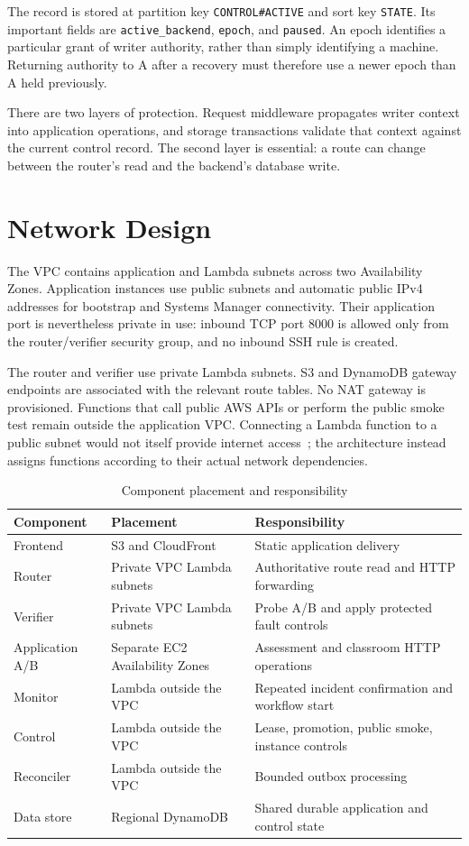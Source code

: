 The record is stored at partition key \texttt{CONTROL\#ACTIVE} and sort key \texttt{STATE}. Its important fields are \texttt{active\_backend}, \texttt{epoch}, and \texttt{paused}. An epoch identifies a particular grant of writer authority, rather than simply identifying a machine. Returning authority to A after a recovery must therefore use a newer epoch than A held previously.

There are two layers of protection. Request middleware propagates writer context into application operations, and storage transactions validate that context against the current control record. The second layer is essential: a route can change between the router's read and the backend's database write.
\section{Network Design}
The VPC contains application and Lambda subnets across two Availability Zones. Application instances use public subnets and automatic public IPv4 addresses for bootstrap and Systems Manager connectivity. Their application port is nevertheless private in use: inbound TCP port 8000 is allowed only from the router/verifier security group, and no inbound SSH rule is created.

The router and verifier use private Lambda subnets. S3 and DynamoDB gateway endpoints are associated with the relevant route tables. No NAT gateway is provisioned. Functions that call public AWS APIs or perform the public smoke test remain outside the application VPC. Connecting a Lambda function to a public subnet would not itself provide internet access~\cite{aws-lambda-vpc}; the architecture instead assigns functions according to their actual network dependencies.


\begin{table}[!htbp]\centering\small
\caption{Component placement and responsibility}\label{tab:placement}
\begin{tabularx}{\textwidth}{@{}L{33mm}L{42mm}Y@{}}\toprule
\textbf{Component} & \textbf{Placement} & \textbf{Responsibility}\\\midrule
Frontend & S3 and CloudFront & Static application delivery\\
Router & Private VPC Lambda subnets & Authoritative route read and HTTP forwarding\\
Verifier & Private VPC Lambda subnets & Probe A/B and apply protected fault controls\\
Application A/B & Separate EC2 Availability Zones & Assessment and classroom HTTP operations\\
Monitor & Lambda outside the VPC & Repeated incident confirmation and workflow start\\
Control & Lambda outside the VPC & Lease, promotion, public smoke, instance controls\\
Reconciler & Lambda outside the VPC & Bounded outbox processing\\
Data store & Regional DynamoDB & Shared durable application and control state\\\bottomrule
\end{tabularx}\end{table}

